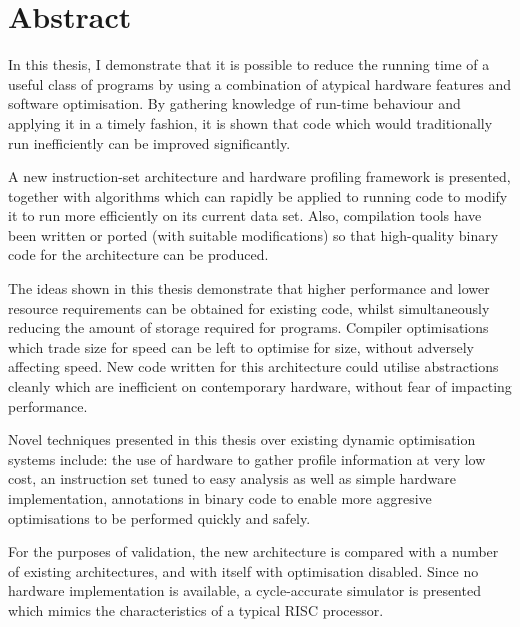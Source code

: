 \chapter*{Abstract}

In this thesis, I demonstrate that it is possible to reduce the running time of a useful class of programs by using a combination of atypical hardware features and software optimisation. By gathering knowledge of run-time behaviour and applying it in a timely fashion, it is shown that code which would traditionally run inefficiently can be improved significantly.

A new instruction-set architecture and hardware profiling framework is presented, together with algorithms which can rapidly be applied to running code to modify it to run more efficiently on its current data set. Also, compilation tools have been written or ported (with suitable modifications) so that high-quality binary code for the architecture can be produced.

The ideas shown in this thesis demonstrate that higher performance and lower resource requirements can be obtained for existing code, whilst simultaneously reducing the amount of storage required for programs. Compiler optimisations which trade size for speed can be left to optimise for size, without adversely affecting speed. New code written for this architecture could utilise abstractions cleanly which are inefficient on contemporary hardware, without fear of impacting performance.

Novel techniques presented in this thesis over existing dynamic optimisation systems include: the use of hardware to gather profile information at very low cost, an instruction set tuned to easy analysis as well as simple hardware implementation, annotations in binary code to enable more aggresive optimisations to be performed quickly and safely.

For the purposes of validation, the new architecture is compared with a number of existing architectures, and with itself with optimisation disabled. Since no hardware implementation is available, a cycle-accurate simulator is presented which mimics the characteristics of a typical RISC processor.
